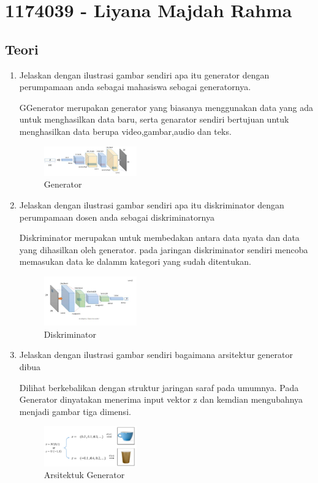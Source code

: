 \section{1174039 - Liyana Majdah Rahma}
    \subsection{Teori}
        \begin{enumerate}
            \item Jelaskan dengan ilustrasi gambar sendiri apa itu generator dengan perumpamaan anda sebagai mahasiswa sebagai generatornya.
            \par GGenerator merupakan generator yang biasanya menggunakan data yang ada untuk menghasilkan data baru, serta genarator sendiri bertujuan untuk menghasilkan data berupa video,gambar,audio dan teks.
            \begin{figure}[H]
                \includegraphics[width=4cm]{figures/1174039/chapter8/teori1.jpg}
             \centering
             \caption{Generator}
            \end{figure}

            \item Jelaskan dengan ilustrasi gambar sendiri apa itu diskriminator dengan perumpamaan dosen anda sebagai diskriminatornya
            \par Diskriminator merupakan untuk membedakan antara data nyata dan data yang dihasilkan oleh generator. pada jaringan diskriminator sendiri mencoba memasukan data ke dalamm kategori yang sudah ditentukan.

            \begin{figure}[H]
                \includegraphics[width=4cm]{figures/1174039/chapter8/teori2.jpg}
                \centering
                  \caption{Diskriminator}
            \end{figure}

            \item Jelaskan dengan ilustrasi gambar sendiri bagaimana arsitektur generator dibua
            \par Dilihat berkebalikan dengan struktur jaringan saraf pada umumnya. Pada Generator dinyatakan menerima input vektor z dan kemdian mengubahnya menjadi gambar tiga dimensi.
            \begin{figure}[H]
                \includegraphics[width=4cm]{figures/1174039/chapter8/teori3.PNG}
                \centering
                  \caption{Arsitektuk Generator}
            \end{figure}


\end{enumerate}
